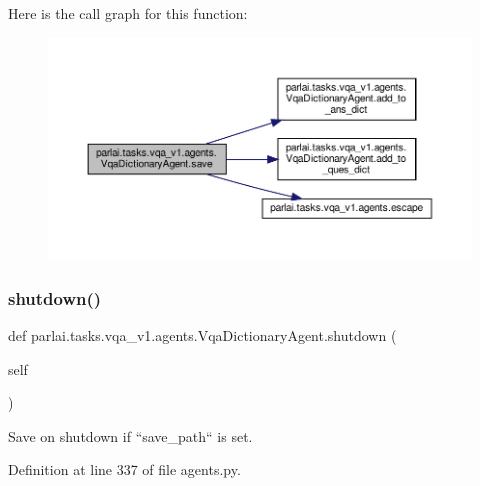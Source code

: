 Here is the call graph for this function\+:
\nopagebreak
\begin{figure}[H]
\begin{center}
\leavevmode
\includegraphics[width=350pt]{classparlai_1_1tasks_1_1vqa__v1_1_1agents_1_1VqaDictionaryAgent_ac547c4960c1f49242d42c07264d6e047_cgraph}
\end{center}
\end{figure}
\mbox{\label{classparlai_1_1tasks_1_1vqa__v1_1_1agents_1_1VqaDictionaryAgent_afcebdb70582204709f5e4365dde00bcb}} 
\subsubsection{\texorpdfstring{shutdown()}{shutdown()}}
{\footnotesize\ttfamily def parlai.\+tasks.\+vqa\+\_\+v1.\+agents.\+Vqa\+Dictionary\+Agent.\+shutdown (\begin{DoxyParamCaption}\item[{}]{self }\end{DoxyParamCaption})}

\begin{DoxyVerb}Save on shutdown if ``save_path`` is set.\end{DoxyVerb}
 

Definition at line 337 of file agents.\+py.



